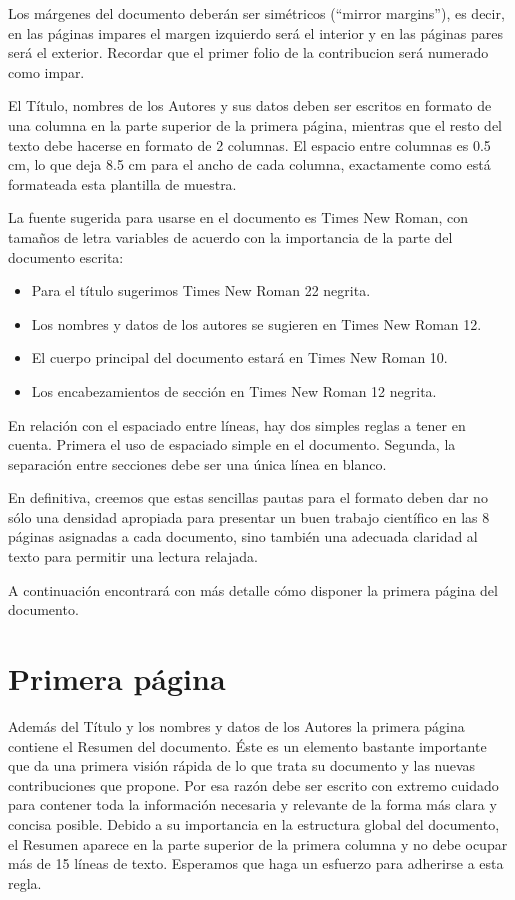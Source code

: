 \documentclass[10pt,a4paper,twoside]{article}
\begin{document}
\begin{multicols}{2}
    Los márgenes del documento deberán ser simétricos (“mirror margins”), es decir, en las páginas impares el margen izquierdo será el interior y en las páginas pares será el exterior. Recordar que el primer folio de la contribucion será numerado como impar.
    
    El Título, nombres de los Autores y sus datos deben ser escritos en formato de una columna en la parte superior de la primera página, mientras que el resto del texto debe hacerse en formato de 2 columnas. El espacio entre columnas es 0.5 cm, lo que deja 8.5 cm para el ancho de cada columna, exactamente como está formateada esta plantilla de muestra.

    La fuente sugerida para usarse en el documento es Times New Roman, con tamaños de letra variables de acuerdo con la importancia de la parte del documento escrita:
    \begin{itemize}
        \item Para el título sugerimos Times New Roman 22 negrita.
        \item Los nombres y datos de los autores se sugieren en Times New Roman 12.
        \item El cuerpo principal del documento estará en Times New Roman 10.
        \item Los encabezamientos de sección en Times New Roman 12 negrita.
    \end{itemize}

    En relación con el espaciado entre líneas, hay dos simples reglas a tener en cuenta. Primera el uso de espaciado simple en el documento. Segunda, la separación entre secciones debe ser una única línea en blanco.

        En definitiva, creemos que estas sencillas pautas para el formato deben dar no sólo una densidad apropiada para presentar un buen trabajo científico en las 8 páginas asignadas a cada documento, sino también una adecuada claridad al texto para permitir una lectura relajada.

    A continuación encontrará con más detalle cómo disponer la primera página del documento.

    \section{Primera página}

    Además del Título y los nombres y datos de los Autores la primera página contiene el Resumen del documento. Éste es un elemento bastante importante que da una primera visión rápida de lo que trata su documento y las nuevas contribuciones que propone. Por esa razón debe ser escrito con extremo cuidado para contener toda la información necesaria y relevante de la forma más clara y concisa posible. Debido a su importancia en la estructura global del documento, el Resumen aparece en la parte superior de la primera columna y no debe ocupar más de 15 líneas de texto. Esperamos que haga un esfuerzo para adherirse a esta regla.
    

\end{multicols}
\end{document}
